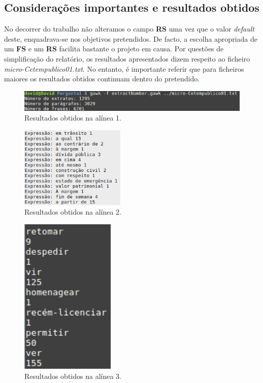 \documentclass[a4paper]{article}
\begin{document}
\subsection{Considerações importantes e resultados obtidos}
No decorrer do trabalho não alteramos o campo \textbf{RS} uma vez que o valor \textit{default} deste, enquadrava-se nos objetivos pretendidos. De facto, a escolha apropriada de um \textbf{FS} e um \textbf{RS} facilita bastante o projeto em causa. Por questões de simplificação do relatório, os resultados apresentados dizem respeito ao ficheiro \textit{micro-Cetempublico01.txt}. No entanto, é importante referir que para ficheiros maiores os resultados obtidos continuam dentro do pretendido.

\begin{figure}[h!]
  \includegraphics[width=\linewidth]{resultado1.png}
  \caption{Resultados obtidos na alínea 1.}
  \label{fig:r1}
\end{figure}


\begin{figure}[h!]
  \includegraphics[width=50mm]{resultado2.png} \centering
  \caption{Resultados obtidos na alínea 2.} 
  \label{fig:r2}
\end{figure}


\begin{figure}[h!]
  \includegraphics[width=45mm]{resultado3.png} \centering
  \caption{Resultados obtidos na alínea 3.}
  \label{fig:r3}
\end{figure}
\end{document}

